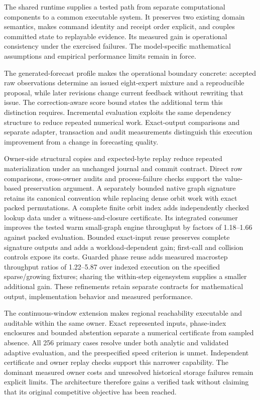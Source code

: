 \documentclass[11pt,a4paper]{article}
\theoremstyle{definition}\newtheorem{definition}[theorem]{Definition}
\begin{document}
The shared runtime supplies a tested path from separate computational components to a common executable system. It preserves two existing domain semantics, makes command identity and receipt order explicit, and couples committed state to replayable evidence. Its measured gain is operational consistency under the exercised failures. The model-specific mathematical assumptions and empirical performance limits remain in force.

The generated-forecast profile makes the operational boundary concrete: accepted raw observations determine an issued eight-expert mixture and a reproducible proposal, while later revisions change current feedback without rewriting that issue. The correction-aware score bound states the additional term this distinction requires. Incremental evaluation exploits the same dependency structure to reduce repeated numerical work. Exact-output comparisons and separate adapter, transaction and audit measurements distinguish this execution improvement from a change in forecasting quality.

Owner-side structural copies and expected-byte replay reduce repeated materialization under an unchanged journal and commit contract. Direct row comparisons, cross-owner audits and process-failure checks support the value-based preservation argument. A separately bounded native graph signature retains its canonical convention while replacing dense orbit work with exact packed permutations. A complete finite orbit index adds independently checked lookup data under a witness-and-closure certificate. Its integrated consumer improves the tested warm small-graph engine throughput by factors of 1.18--1.66 against packed evaluation. Bounded exact-input reuse preserves complete signature outputs and adds a workload-dependent gain; first-call and collision controls expose its costs. Guarded phase reuse adds measured macrostep throughput ratios of 1.22--5.87 over indexed execution on the specified sparse/growing fixtures; sharing the within-step eigensystem supplies a smaller additional gain. These refinements retain separate contracts for mathematical output, implementation behavior and measured performance.

The continuous-window extension makes regional reachability executable and auditable within the same owner. Exact represented inputs, phase-index enclosures and bounded abstention separate a numerical certificate from sampled absence. All 256 primary cases resolve under both analytic and validated adaptive evaluation, and the prespecified speed criterion is unmet. Independent certificate and owner replay checks support this narrower capability. The dominant measured owner costs and unresolved historical storage failures remain explicit limits. The architecture therefore gains a verified task without claiming that its original competitive objective has been reached.
\end{document}
